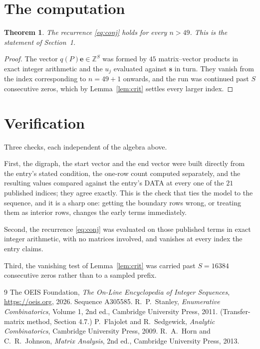 \documentclass[11pt,a4paper]{article}
\theoremstyle{plain}
\newtheorem{theorem}{Theorem}
\theoremstyle{definition}
\begin{document}
\section{The computation}

\begin{theorem}
The recurrence \eqref{eq:conj} holds for every $n>49$. This is the statement of
Section~1.
\end{theorem}

\begin{proof}
The vector $q(P)\mathbf{e}\in\mathbb{Z}^{S}$ was formed by $45$ matrix--vector
products in exact integer arithmetic and the $u_j$ evaluated against $\mathbf{s}$ in turn.
They vanish from the index corresponding to $n=49+1$ onwards, and the run was continued
past $S$ consecutive zeros, which by Lemma~\ref{lem:crit} settles every larger index.
\end{proof}

\section{Verification}

Three checks, each independent of the algebra above.

First, the digraph, the start vector and the end vector were built directly from the
entry's stated condition, the one-row count computed separately, and the resulting values
compared against the entry's DATA at every one of the $21$ published indices; they
agree exactly. This is the check that ties the model to the sequence, and it is a sharp one:
getting the boundary rows wrong, or treating them as interior rows, changes the early terms
immediately.

Second, the recurrence \eqref{eq:conj} was evaluated on those published terms in exact
integer arithmetic, with no matrices involved, and vanishes at every index the entry claims.

Third, the vanishing test of Lemma~\ref{lem:crit} was carried past $S=16384$ consecutive
zeros rather than to a sampled prefix.

\begin{thebibliography}{9}
 The OEIS Foundation, \emph{The On-Line Encyclopedia of Integer
Sequences}, \url{https://oeis.org}, 2026. Sequence A305585.
 R.~P.~Stanley, \emph{Enumerative Combinatorics}, Volume 1, 2nd ed.,
Cambridge University Press, 2011. (Transfer-matrix method, Section 4.7.)
 P.~Flajolet and R.~Sedgewick, \emph{Analytic Combinatorics}, Cambridge
University Press, 2009.
 R.~A.~Horn and C.~R.~Johnson, \emph{Matrix Analysis}, 2nd ed., Cambridge
University Press, 2013.
\end{thebibliography}
\end{document}
